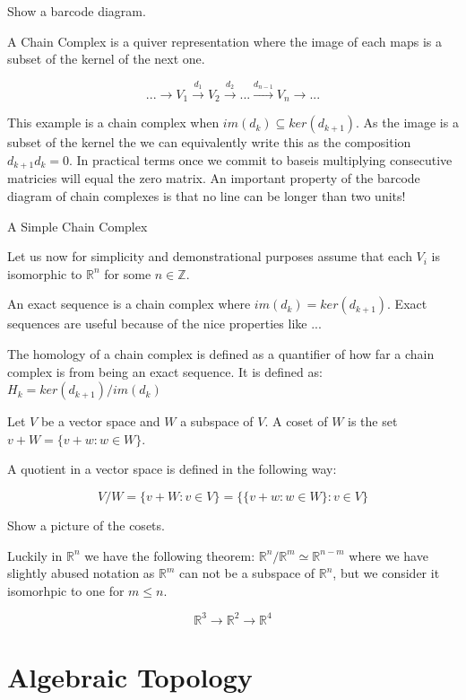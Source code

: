 Show a barcode diagram.

A Chain Complex is a quiver representation where the image of each maps is a subset of the kernel of the next one.

$$ ... \longrightarrow V_1 \overset{d_1}{\longrightarrow} V_2 \overset{d_2}{\longrightarrow} ... \overset{d_{n-1}}{\longrightarrow} V_n  \longrightarrow ... $$

This example is a chain complex when $im(d_k) \subseteq ker(d_{k+1})$. As the image is a subset of the kernel the we can equivalently write this as the composition $d_{k+1}d_k = 0$. In practical terms once we commit to baseis multiplying consecutive matricies will equal the zero matrix. An important property of the barcode diagram of chain complexes is that no line can be longer than two units!


\begin{ex}  A Simple Chain Complex \end{ex}
Let us now for simplicity and demonstrational purposes assume that each $V_i$ is isomorphic to $\mathbb{R}^n$ for some $n \in \mathbb{Z}$.


An exact sequence is a chain complex where $im(d_k) = ker(d_{k+1})$. Exact sequences are useful because of the nice properties like ...

The homology of a chain complex is defined as a quantifier of how far a chain complex is from being an exact sequence. It is defined as: $ H_k = ker(d_{k+1}) / im(d_k) $

Let $V$ be a vector space and $W$ a subspace of $V$. A coset of $W$ is the set $v + W = \{v + w : w \in W\}$.

A quotient in a vector space is defined in the following way: 

$$ V/W = \{v + W: v \in V\} = \{\{v + w : w \in W\} : v \in V \}$$

Show a picture of the cosets.

Luckily in $\mathbb{R}^n$ we have the following theorem: $\mathbb{R}^n / \mathbb{R}^m \simeq \mathbb{R}^{n - m} $ where we have slightly abused notation as $\mathbb{R}^m$ can not be a subspace of $\mathbb{R}^n$, but we consider it isomorhpic to one for $m \le n$.

$$ \mathbb{R}^3 {\longrightarrow} \mathbb{R}^2 {\longrightarrow} \mathbb{R}^4 $$


\section{Algebraic Topology}


